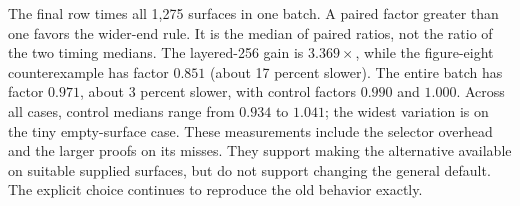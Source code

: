 The final row times all 1,275 surfaces in one batch. A paired factor greater
than one favors the wider-end rule. It is the median of paired ratios,
not the ratio of the two timing medians. The layered-256 gain is
$3.369\times$, while the figure-eight counterexample has factor $0.851$
(about 17 percent slower). The entire batch has factor $0.971$, about
3 percent slower, with control factors $0.990$ and $1.000$. Across all cases,
control medians range from $0.934$ to $1.041$; the widest variation is on
the tiny empty-surface case. These measurements include the
selector overhead and the larger proofs on its misses. They support making
the alternative available on suitable supplied surfaces, but do not support
changing the general default. The explicit  choice continues
to reproduce the old behavior exactly.
